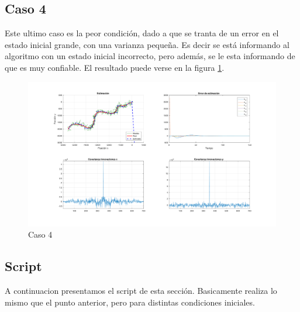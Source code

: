 	\subsection{Caso 4}
	
	Este ultimo caso es la peor condición, dado a que se tranta de un error en el estado inicial grande, con una varianza pequeña. Es decir  se está informando al algoritmo con un estado inicial incorrecto, pero además, se le esta informando de que es muy confiable. El resultado puede verse en la figura \ref{fig:ej3d}.
	
		\begin{figure}[H]
			\centering
			\includegraphics[width=1.0\textwidth,keepaspectratio]{Figuras/graf_ej3d.pdf}
			\caption{Caso 4}
			\label{fig:ej3d}
		\end{figure}
		
	\subsection{Script}
	
		A continuacion presentamos el script de esta sección. Basicamente realiza lo mismo que el punto anterior, pero para distintas condiciones iniciales.

%	
	
